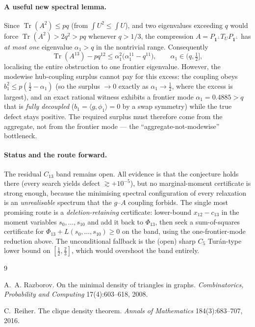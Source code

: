 \documentclass[11pt]{article}
\newcommand{\one}{\mathbf 1}
\DeclareMathOperator{\Tr}{Tr}
\begin{document}
\paragraph{A useful new spectral lemma.}
Since $\Tr(A^2)\le pq$ (from $\int U^2\le\int U$), and two eigenvalues exceeding $q$ would force
$\Tr(A^2)>2q^2>pq$ whenever $q>1/3$, the compression $A=P_{\one^\perp}T_UP_{\one^\perp}$ has
\emph{at most one} eigenvalue $\alpha_1>q$ in the nontrivial range.  Consequently
\[
        \Tr(A^{13})-pq^{12}\le \alpha_1^2\bigl(\alpha_1^{11}-q^{11}\bigr),
        \qquad \alpha_1\in(q,\tfrac12],
\]
localising the entire obstruction to one frontier eigenvalue.  However, the modewise
hub-coupling surplus cannot pay for this excess: the coupling obeys $b_1^2\le p(\tfrac12-\alpha_1)$
(so the surplus $\to0$ exactly as $\alpha_1\to\tfrac12$, where the excess is largest), and an exact
rational witness exhibits a frontier mode $\alpha_1=0.4885>q$ that is \emph{fully decoupled}
($b_1=\langle g,\phi_1\rangle=0$ by a swap symmetry) while the true defect stays positive.  The required
surplus must therefore come from the aggregate, not from the frontier mode --- the
``aggregate-not-modewise'' bottleneck.

\paragraph{Status and the route forward.}
The residual $C_{13}$ band remains open.  All evidence is that the conjecture holds there (every
search yields defect $\gtrsim+10^{-5}$), but no marginal-moment certificate is strong enough,
because the minimising spectral configuration of every relaxation is an \emph{unrealisable} spectrum
that the $g$--$A$ coupling forbids.  The single most promising route is a \emph{deletion-retaining}
certificate: lower-bound $x_{12}-c_{13}$ in the moment variables $s_0,\dots,s_{10}$ and add it back to
$\Phi_{13}$, then seek a sum-of-squares certificate for $\Phi_{13}+L(s_0,\dots,s_{10})\ge0$ on the band,
using the one-frontier-mode reduction above.  The unconditional fallback is the (open) sharp
$C_5$ Tur\'an-type lower bound on $[\tfrac12,\tfrac23]$, which would overshoot the band entirely.

\begin{thebibliography}{9}

A.~A. Razborov.
\newblock On the minimal density of triangles in graphs.
\newblock \emph{Combinatorics, Probability and Computing} 17(4):603--618, 2008.

C.~Reiher.
\newblock The clique density theorem.
\newblock \emph{Annals of Mathematics} 184(3):683--707, 2016.

\end{thebibliography}
\end{document}
